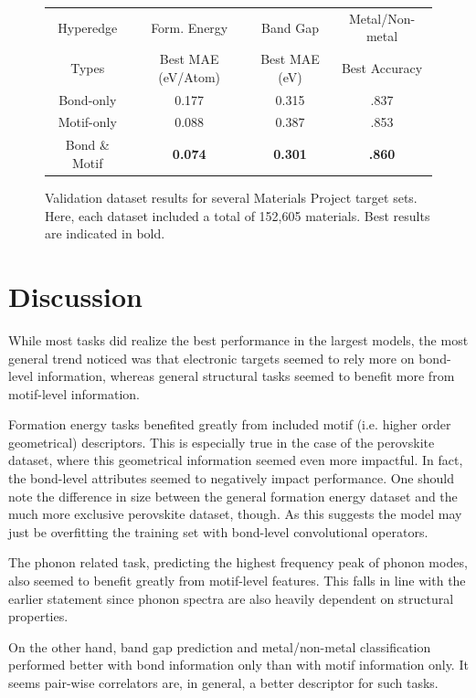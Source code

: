 \documentclass[10pt,a4paper]{article}
\begin{document}
\begin{figure}
\begin{tabular}{c|ccc}
Hyperedge & Form. Energy & Band Gap & Metal/Non-metal \\
Types & Best MAE (eV/Atom) & Best MAE (eV) & Best Accuracy \\
\hline
Bond-only & 0.177 & 0.315 & .837 \\
Motif-only &  0.088 & 0.387 & .853\\
Bond \& Motif &  \textbf{0.074} & \textbf{0.301 } & \textbf{.860}\\
\end{tabular}
\caption{Validation dataset results for several Materials Project target sets. Here, each dataset included a total of 152,605 materials. Best results are indicated in bold.}
\end{figure}



\section{Discussion} 
While most tasks did realize the best performance in the largest models,  the most general trend noticed was that electronic targets seemed to rely more on bond-level information, whereas general structural tasks seemed to benefit more from motif-level information.

Formation energy tasks benefited greatly from included motif (i.e. higher order geometrical) descriptors. This is especially true in the case of the perovskite dataset, where this geometrical information seemed even more impactful. In fact, the bond-level attributes seemed to negatively impact performance. One should note the difference in size between the general formation energy dataset and the much more exclusive perovskite dataset, though. As this suggests the model may just be overfitting the training set with bond-level convolutional operators.

The phonon related task, predicting the highest frequency peak of phonon modes, also seemed to benefit greatly from motif-level features. This falls in line with the earlier statement since phonon spectra are also heavily dependent on structural properties.

On the other hand, band gap prediction and metal/non-metal classification performed better with bond information only than with motif information only. It seems pair-wise correlators are, in general, a better descriptor for such tasks.
\end{document}
